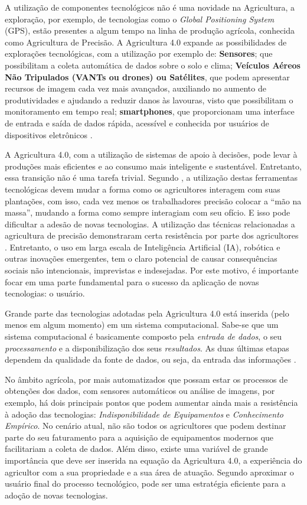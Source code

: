 \documentclass[12pt]{article}
\begin{document}
A utilização de componentes tecnológicos não é uma novidade na Agricultura, a exploração, por exemplo, de tecnologias como o \textit{Global Positioning System} (GPS), estão presentes a algum tempo na linha de produção agrícola, conhecida como Agricultura de Precisão. A Agricultura 4.0 expande as possibilidades de explorações tecnológicas, com a utilização por exemplo de: \textbf{Sensores}; que possibilitam a coleta automática de dados sobre o solo e clima; \textbf{Veículos Aéreos Não Tripulados (VANTs ou drones) ou Satélites}, que podem apresentar recursos de imagem cada vez mais avançados, auxiliando no aumento de produtividades e ajudando a reduzir danos às lavouras, visto que possibilitam o monitoramento em tempo real; \textbf{smartphones}, que proporcionam uma interface de entrada e saída de dados rápida, acessível e conhecida por usuários de dispositivos eletrônicos \cite{Shepherd:2018}.

A Agricultura 4.0, com a utilização de sistemas de apoio à decisões, pode levar à produções mais eficientes e ao consumo mais inteligente e sustentável. Entretanto, essa transição não é uma tarefa trivial. Segundo , a utilização destas ferramentas tecnológicas devem mudar a forma como os agricultores interagem com suas plantações, com isso, cada vez menos os trabalhadores precisão colocar a ``mão na massa'', mudando a forma como sempre interagiam com seu ofício. E isso pode dificultar a adesão de novas tecnologias. A utilização das técnicas relacionadas a agricultura de precisão demonstraram certa resistência por parte dos agricultores \cite{Rose:2019}. Entretanto, o uso em larga escala de Inteligência Artificial (IA), robótica e outras inovações emergentes, tem o claro potencial de causar consequências sociais não intencionais, imprevistas e indesejadas. Por este motivo, é importante focar em uma parte fundamental para o sucesso da aplicação de novas tecnologias: o usuário.

Grande parte das tecnologias adotadas pela Agricultura 4.0 está inserida (pelo menos em algum momento) em um sistema computacional. Sabe-se que um sistema computacional é basicamente composto pela \textit{entrada de dados}, o seu \textit{processamento} e a disponibilização dos seus \textit{resultados}. As duas últimas etapas dependem da qualidade da fonte de dados, ou seja, da entrada das informações \cite{Torres:2013}.

No âmbito agrícola, por mais automatizados que possam estar os processos de obtenções dos dados, com sensores automáticos ou análise de imagens, por exemplo, há dois principais pontos que podem aumentar ainda mais a resistência à adoção das tecnologias: \textit{Indisponibilidade de Equipamentos} e \textit{Conhecimento Empírico}. No cenário atual, não são todos os agricultores que podem destinar parte do seu faturamento para a aquisição de equipamentos modernos que facilitariam a coleta de dados. Além disso, existe uma variável de grande importância que deve ser inserida na equação da Agricultura 4.0, a experiência do agricultor com a sua propriedade e a sua área de atuação. Segundo  aproximar o usuário final do processo tecnológico, pode ser uma estratégia eficiente para a adoção de novas tecnologias.
\end{document}
